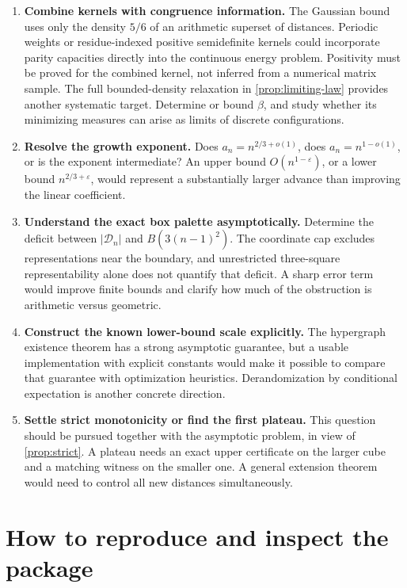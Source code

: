 \documentclass[11pt,letterpaper]{article}
\theoremstyle{definition}
\newcommand{\calD}{\mathcal D}
\begin{document}
\begin{enumerate}[label=\textbf{\arabic*.},leftmargin=*]
\item \textbf{Combine kernels with congruence information.}
The Gaussian bound uses only the density \(5/6\) of an arithmetic
superset of distances. Periodic weights or residue-indexed positive
semidefinite kernels could incorporate parity capacities directly
into the continuous energy problem. Positivity must be proved for
the combined kernel, not inferred from a numerical matrix sample.
The full bounded-density relaxation in \cref{prop:limiting-law}
provides another systematic target. Determine or bound \(\beta\),
and study whether its minimizing measures can arise as limits of
discrete configurations.

\item \textbf{Resolve the growth exponent.}
Does \(a_n=n^{2/3+o(1)}\), does \(a_n=n^{1-o(1)}\), or is the exponent
intermediate? An upper bound \(O(n^{1-\varepsilon})\), or a lower
bound \(n^{2/3+\varepsilon}\), would represent a substantially larger
advance than improving the linear coefficient.

\item \textbf{Understand the exact box palette asymptotically.}
Determine the deficit between \(|\calD_n|\) and
\(B(3(n-1)^2)\). The coordinate cap excludes representations near
the boundary, and unrestricted three-square representability alone
does not quantify that deficit. A sharp error term would improve
finite bounds and clarify how much of the obstruction is arithmetic
versus geometric.

\item \textbf{Construct the known lower-bound scale explicitly.}
The hypergraph existence theorem has a strong asymptotic guarantee,
but a usable implementation with explicit constants would make it
possible to compare that guarantee with optimization heuristics.
Derandomization by conditional expectation is another concrete
direction.

\item \textbf{Settle strict monotonicity or find the first plateau.}
This question should be pursued together with the asymptotic problem,
in view of \cref{prop:strict}. A plateau needs an exact upper
certificate on the larger cube and a matching witness on the smaller
one. A general extension theorem would need to control all new
distances simultaneously.
\end{enumerate}

\appendix
\section{How to reproduce and inspect the package}
\label{app:reproduce}

\end{document}
